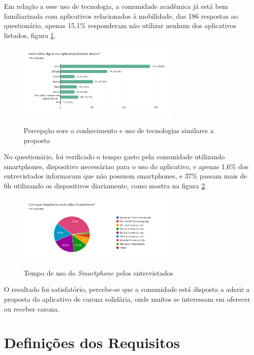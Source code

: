 Em relação a esse uso de tecnologia, a comunidade acadêmica já está bem familiarizada com aplicativos relacionados à mobilidade, das 186 respostas ao questionário, apenas 15,1\% responderam não utilizar nenhum dos aplicativos listados, figura \ref{fig:conhecimento-sobre-apps}.

\begin{figure}[!hbtp]
	\centering
	\caption{Percepção sore o conhecimento e uso de tecnologias similares a proposta}
	\includegraphics[width=0.7\textwidth]{./04-figuras/questionario/16.png}
	\label{fig:conhecimento-sobre-apps}
\end{figure}

No questionário, foi verificado o tempo gasto pela comunidade utilizando smartphones, dispositivo necessáriao para o uso do aplicativo, e apenas 1,6\% dos entrevistados informaram que não possuem smartphones, e 37\% passam mais de 6h utilizando os dispositivos diariamente, como mostra na figura \ref{fig:usodosmartphone}.

\begin{figure}[!hbtp]
	\centering
	\caption{Tempo de uso do \textit{Smartphone} pelos entrevistados}
	\includegraphics[width=0.7\textwidth]{./04-figuras/questionario/17.png}
	\label{fig:usodosmartphone}
\end{figure}

O resultado foi satisfatório, percebe-se que a comunidade está disposta a aderir a proposta do aplicativo de carona solidária, onde muitos se interessam em oferecer ou receber carona. 

\section{Definições dos Requisitos}

